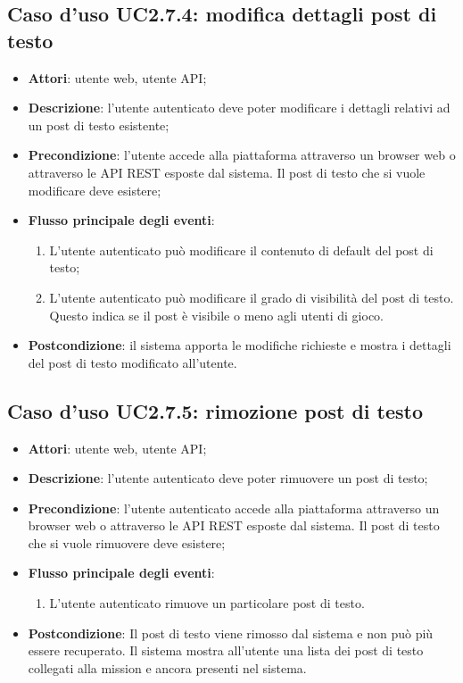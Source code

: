 \subsection{Caso d'uso UC2.7.4: modifica dettagli post di testo}
\begin{itemize}
\item \textbf{Attori}: utente web, utente API;
\item \textbf{Descrizione}: l'utente autenticato deve poter modificare i dettagli relativi ad un post di testo esistente; 
      \item \textbf{Precondizione}: l'utente accede alla piattaforma attraverso un browser web o attraverso le API REST esposte dal sistema. Il post di testo che si vuole modificare deve esistere;

        \item \textbf{Flusso principale degli eventi}:
          \begin{enumerate}
          \item L'utente autenticato può modificare il contenuto di default del post di testo;
          \item L'utente autenticato può modificare il grado di visibilità del post di testo. Questo indica se il post è visibile o meno agli utenti di gioco.

      \end{enumerate}
    \item \textbf{Postcondizione}: il sistema apporta le modifiche richieste e mostra i dettagli del post di testo modificato all'utente.
  \end{itemize}
\hypertarget{UC2.7.5}{}
\subsection{Caso d'uso UC2.7.5: rimozione post di testo}
\begin{itemize}
\item \textbf{Attori}: utente web, utente API;
\item \textbf{Descrizione}: l'utente autenticato deve poter rimuovere un post di testo; 
      \item \textbf{Precondizione}: l'utente autenticato accede alla piattaforma attraverso un browser web o attraverso le API REST esposte dal sistema. Il post di testo che si vuole rimuovere deve esistere;

        \item \textbf{Flusso principale degli eventi}:
          \begin{enumerate}
          \item L'utente autenticato rimuove un particolare post di testo.

      \end{enumerate}
    \item \textbf{Postcondizione}: Il post di testo viene rimosso dal sistema e non può più essere recuperato. Il sistema mostra all'utente una lista dei post di testo collegati alla mission e ancora presenti nel sistema.
  \end{itemize}
\hypertarget{UC2.7.6}{}
